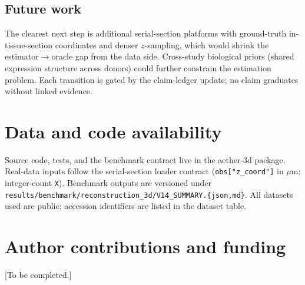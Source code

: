 \documentclass[10pt,letterpaper]{article}
\begin{document}
\subsection{Future work}

The clearest next step is additional serial-section platforms with ground-truth
in-tissue-section coordinates and denser $z$-sampling, which would shrink the
estimator$\to$oracle gap from the data side.
Cross-study biological priors (shared expression structure across donors) could further
constrain the estimation problem.
Each transition is gated by the claim-ledger update; no claim graduates without linked
evidence.

\section*{Data and code availability}

Source code, tests, and the benchmark contract live in the aether-3d package.
Real-data inputs follow the serial-section loader contract
(\texttt{obs["z\_coord"]} in $\mu$m; integer-count \texttt{X}).
Benchmark outputs are versioned under
\texttt{results/benchmark/reconstruction\_3d/V14\_SUMMARY.\{json,md\}}.
All datasets used are public; accession identifiers are listed in the dataset table.

\section*{Author contributions and funding}

[To be completed.]



\end{document}
